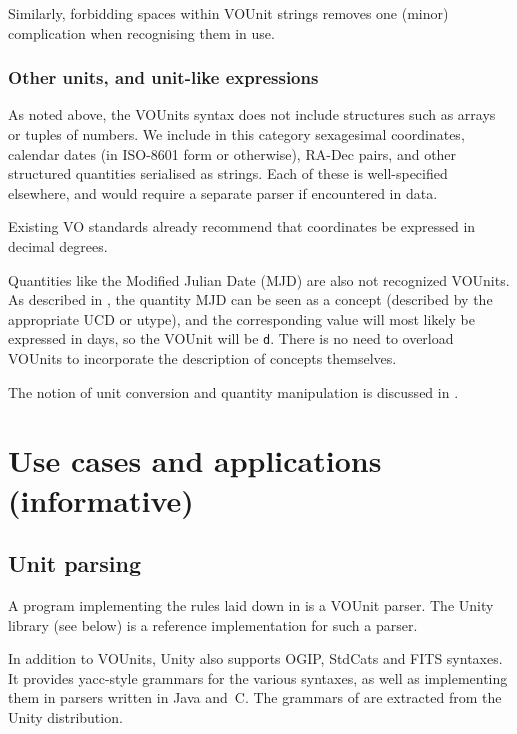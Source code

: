 \documentclass[11pt,a4paper]{ivoa}
\newcommand{\unit}[1]{\texttt{\small\color{orange}#1}}
\begin{document}
Similarly, forbidding spaces within VOUnit strings removes one (minor)
complication when recognising them in use.

\subsubsection{Other units, and unit-like expressions}

As noted above, the VOUnits syntax does not include structures such as
arrays or tuples of numbers.  We include in this category sexagesimal
coordinates, calendar dates (in ISO-8601 form or otherwise),
RA-Dec pairs, and other structured quantities serialised as strings.
Each of these is well-specified elsewhere, and would require a
separate parser if encountered in data.

Existing VO standards already recommend that coordinates be expressed
in decimal degrees.

Quantities like the Modified Julian Date (MJD) are also not recognized
VOUnits. As described in , the quantity MJD
can be seen as a concept (described by the appropriate UCD or utype),
and the corresponding value will most likely be expressed in days, so
the VOUnit will be \unit{d}. There is no need to overload VOUnits to
incorporate the description of concepts themselves.

The notion of unit conversion and quantity manipulation is discussed in
.

\section{Use cases and applications (informative)\label{sec:useCase}}

\subsection{Unit parsing}
\label{sec:parsers}

A program implementing the rules laid down in 
is a VOUnit parser.   The Unity library (see below) is a
reference implementation for such a parser.

In addition to VOUnits, Unity also supports
OGIP, StdCats and FITS syntaxes.  It provides yacc-style grammars for
the various syntaxes, as well as implementing them in parsers written
in Java and~C.  The grammars of  are extracted
from the Unity distribution.
\end{document}
